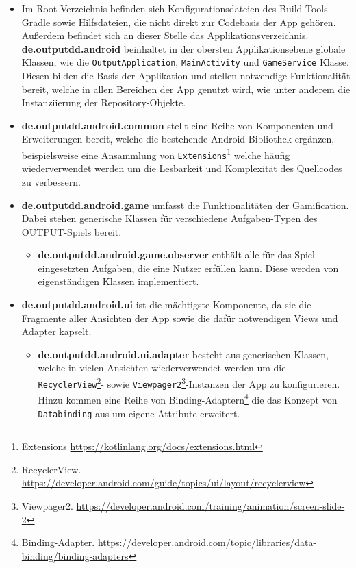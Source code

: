 \begin{itemize}
    \item Im Root-Verzeichnis befinden sich Konfigurationsdateien des Build-Tools Gradle sowie Hilfsdateien, die nicht direkt zur Codebasis der App gehören. Außerdem befindet sich an dieser Stelle das Applikationsverzeichnis.
    \textbf{de.outputdd.android} beinhaltet in der obersten Applikationsebene globale Klassen, wie die \texttt{OutputApplication}, \texttt{MainActivity} und \texttt{GameService} Klasse. Diesen bilden die Basis der Applikation und stellen notwendige Funktionalität bereit, welche in allen Bereichen der App genutzt wird, wie unter anderem die Instanziierung der Repository-Objekte.
    \item \textbf{de.outputdd.android.common} stellt eine Reihe von Komponenten und Erweiterungen bereit, welche die bestehende Android-Bibliothek ergänzen, beispielsweise eine Ansammlung von \texttt{Extensions}\footnote{Extensions \url{https://kotlinlang.org/docs/extensions.html}} welche häufig wiederverwendet werden um die Lesbarkeit und Komplexität des Quellcodes zu verbessern.  
    \item \textbf{de.outputdd.android.game} umfasst die Funktionalitäten der Gamification. Dabei stehen generische Klassen für verschiedene Aufgaben-Typen des OUTPUT-Spiels bereit.
        \begin{itemize}
            \item \textbf{de.outputdd.android.game.observer} enthält alle für das Spiel eingesetzten Aufgaben, die eine Nutzer erfüllen kann. Diese werden von eigenständigen Klassen implementiert.
        \end{itemize} \newpage
    \item \textbf{de.outputdd.android.ui} ist die mächtigste Komponente, da sie die Fragmente aller Ansichten der App sowie die dafür notwendigen Views und Adapter kapselt. 
        \begin{itemize}
            \item \textbf{de.outputdd.android.ui.adapter} besteht aus generischen Klassen, welche in vielen Ansichten wiederverwendet werden um die \texttt{RecyclerView}\footnote{RecyclerView. \url{https://developer.android.com/guide/topics/ui/layout/recyclerview}}- sowie \texttt{Viewpager2}\footnote{Viewpager2. \url{https://developer.android.com/training/animation/screen-slide-2}}-Instanzen der App zu konfigurieren. Hinzu kommen eine Reihe von Binding-Adaptern\footnote{Binding-Adapter. \url{https://developer.android.com/topic/libraries/data-binding/binding-adapters}} die das Konzept von \texttt{Databinding} aus  um eigene Attribute erweitert.

\end{itemize}
\end{itemize}

